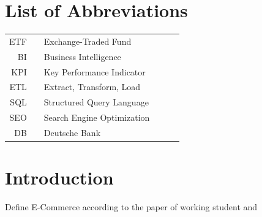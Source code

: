 \documentclass[11pt,a4paper]{article}
\begin{document}
\onehalfspacing
\setcounter{tocdepth}{4}
\parindent=0in
\parskip=8pt  %
\setlength{\belowcaptionskip}{-10pt}

\newpage
\tableofcontents

\newpage

\pagebreak
\listoffigures
\newpage
\section*{List of Abbreviations}

\begin{tabular}{rp{0.2cm}lp{1cm}p{7cm}l}
    ETF     & &  \small Exchange-Traded Fund   & &      \\
    BI     & &  \small Business Intelligence   & & \\
    KPI     & &  \small Key Performance Indicator   & & \\
    ETL     & &  \small Extract, Transform, Load   & & \\
    SQL     & &  \small Structured Query Language  & & \\
    SEO     & &  \small Search Engine Optimization  & & \\
        DB     & &  \small Deutsche Bank  & & \\
\end{tabular}

\captionsetup{justification=justified,singlelinecheck=false}

\pagebreak
{}
\flushbottom
\doublespacing
\parindent=1cm

\section{Introduction}
Define E-Commerce according to the paper of working student and 
\end{document}
